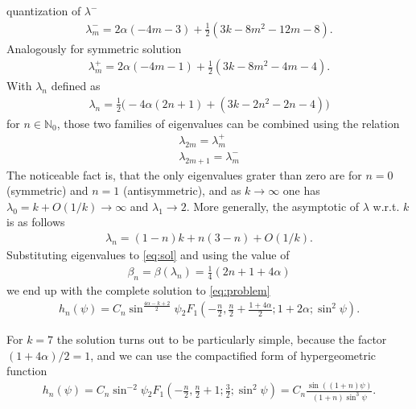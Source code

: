 \documentclass[
a4paper,%
10pt,%
titlepage,%
twoside%
]{article}
\begin{document}
quantization of $\lambda^-$
\begin{gather}
  \lambda^-_m=2\alpha (-4 m-3)+\frac{1}{2}(3 k-8
  m^2-12 m-8).
\end{gather}
Analogously for symmetric solution
\begin{gather}
  \lambda^+_m=2\alpha(-4 m-1)+\frac{1}{2} (3 k-8
  m^2-4 m-4).
\end{gather}
With $\lambda_n$ defined as
\begin{gather}
  \lambda_n=\frac{1}{2}\big(-4\alpha(2n+1)+
  (3k-2n^2-2n-4)\big)
\end{gather}
for $n\in\mathbb{N}_0$, those two families of eigenvalues can be combined
using the relation
\begin{gather}
  \lambda_{2m}=\lambda_m^+\\
  \lambda_{2m+1}=\lambda_m^-
\end{gather}
The noticeable fact is, that the only eigenvalues grater than zero are
for $n=0$ (symmetric) and $n=1$ (antisymmetric), and as
$k\rightarrow\infty$ one has $\lambda_0= k + O(1/k)\rightarrow\infty$
and $\lambda_1\rightarrow 2$. More generally, the asymptotic of
$\lambda$ w.r.t. $k$ is as follows
\begin{gather}
  \lambda_n=(1-n)k+n(3-n)+O(1/k).
\end{gather}
Substituting eigenvalues to \eqref{eq:sol} and using the value of
\begin{gather}
  \beta_n=\beta(\lambda_n)=\frac{1}{4}(2n+1+4\alpha)
\end{gather}
we end up with the complete solution to \eqref{eq:problem}
\begin{gather}
  h_n(\psi)=C_n\sin^{\frac{4\alpha-k+2}{2}}\psi {}_2 F_1 (-\frac{n}{2},\frac{n}{2}+\frac{1+4\alpha}{2};1+2\alpha;\sin^2\psi).
\end{gather}


For $k=7$ the solution turns out to be particularly simple, because the
factor $(1+4\alpha)/2=1$, and we can use the compactified form of
hypergeometric function
\begin{gather}
  h_n(\psi)=C_n\sin^{-2}\psi
  {}_2F_1(-\frac{n}{2},\frac{n}{2}+1;\frac{3}{2};\sin^2\psi)
  =C_n\frac{\sin((1+n)\psi)}{(1+n)\sin^3\psi}.
\end{gather}
\end{document}
